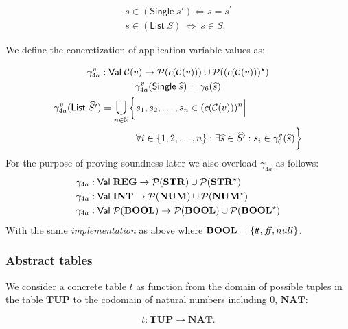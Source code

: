 \begin{align}
    s \in (\mathsf{Single} \; s') \iff s = s^\prime \\
    s \in (\mathsf{List} \; S) \ \iff \ s \in S.
\end{align}


We define the concretization of application variable values as:


\begin{gather}
    \gamma^v_{4a} : \mathsf{Val} \; \mathcal{C}(v) \rightarrow \mathcal{P}(c(\mathcal{C}(v))) \cup\mathcal{P}((c(\mathcal{C}(v)))^\star)\\
    \gamma^v_{4a}(\mathsf{Single} \; \widehat{s}) = \gamma_6(\widehat{s})\\
    \begin{split}
        \gamma^v_{4a}(\mathsf{List} \; \widehat{S'}) = \bigcup_{n \in \mathbb{N}}\biggl\{&s_1, s_2, \dots, s_n \in (c(\mathcal{C}(v)))^n \Big|\\
        &\forall i \in \{1, 2, \dots, n\} : \exists \widehat{s} \in \widehat{S'} : s_i \in \gamma^v_6(\widehat{s}) \biggr\}
    \end{split}
\end{gather}
For the purpose of proving soundness later we also overload $\gamma_{4a}$ as follows:
\begin{align}
    \gamma_{4a} &: \mathsf{Val} \; \mathbf{REG} \rightarrow \mathcal{P}(\mathbf{STR}) \cup \mathcal{P}(\mathbf{STR}^\star)\\
    \gamma_{4a} &: \mathsf{Val} \; \mathbf{INT} \rightarrow \mathcal{P}(\mathbf{NUM}) \cup \mathcal{P}(\mathbf{NUM}^\star) \\
    \gamma_{4a} &: \mathsf{Val} \; \mathcal{P}(\mathbf{BOOL}) \rightarrow \mathcal{P}(\mathbf{BOOL}) \cup \mathcal{P}(\mathbf{BOOL}^\star)
\end{align}
With the same \emph{implementation} as above where $\mathbf{BOOL} = \{t\!t, f\!\!f, null\}$.

\subsubsection{Abstract tables}\label{subsubsec:abstract_domain_of_tables}

We consider a concrete table $t$ as function from the domain of possible tuples in the table $\mathbf{TUP}$ to the codomain of natural numbers including $0$, $\mathbf{NAT}$:


\begin{equation}
    t : \mathbf{TUP} \rightarrow \mathbf{NAT}.\label{eq:equation-tup-nat}
\end{equation}



